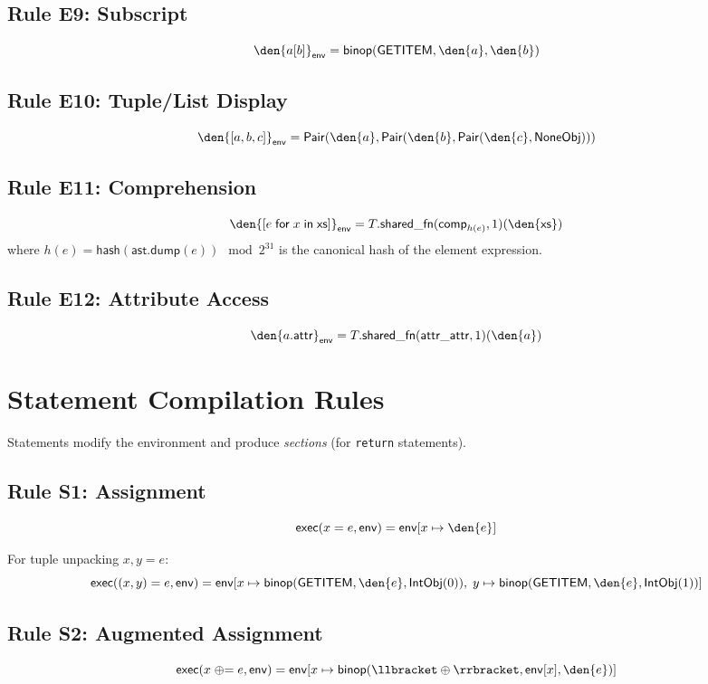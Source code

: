 \subsection{Rule E9: Subscript}
\[
  \den{a[b]}_\mathsf{env} = \mathsf{binop}(\mathsf{GETITEM},
    \den{a}, \den{b})
\]

\subsection{Rule E10: Tuple/List Display}
\[
  \den{[a, b, c]}_\mathsf{env} = \mathsf{Pair}(\den{a},
    \mathsf{Pair}(\den{b}, \mathsf{Pair}(\den{c}, \mathsf{NoneObj})))
\]

\subsection{Rule E11: Comprehension}
\[
  \den{[e \;\mathsf{for}\; x \;\mathsf{in}\; \mathsf{xs}]}_\mathsf{env}
    = T.\mathsf{shared\_fn}(\mathsf{comp}_{h(e)}, 1)(\den{\mathsf{xs}})
\]
where $h(e) = \mathsf{hash}(\mathsf{ast.dump}(e)) \mod 2^{31}$ is
the canonical hash of the element expression.

\subsection{Rule E12: Attribute Access}
\[
  \den{a.\mathsf{attr}}_\mathsf{env} = T.\mathsf{shared\_fn}(
    \mathsf{attr\_attr}, 1)(\den{a})
\]


\section{Statement Compilation Rules}

Statements modify the environment and produce \emph{sections} (for
\texttt{return} statements).

\subsection{Rule S1: Assignment}
\[
  \mathsf{exec}(x = e, \mathsf{env}) = \mathsf{env}[x \mapsto \den{e}]
\]

For tuple unpacking $x, y = e$:
\[
  \mathsf{exec}((x, y) = e, \mathsf{env}) = \mathsf{env}[
    x \mapsto \mathsf{binop}(\mathsf{GETITEM}, \den{e},
      \mathsf{IntObj}(0)),\;
    y \mapsto \mathsf{binop}(\mathsf{GETITEM}, \den{e},
      \mathsf{IntObj}(1))]
\]

\subsection{Rule S2: Augmented Assignment}
\[
  \mathsf{exec}(x \mathrel{\oplus}= e, \mathsf{env}) = \mathsf{env}[
    x \mapsto \mathsf{binop}(\llbracket \oplus \rrbracket,
    \mathsf{env}[x], \den{e})]
\]

